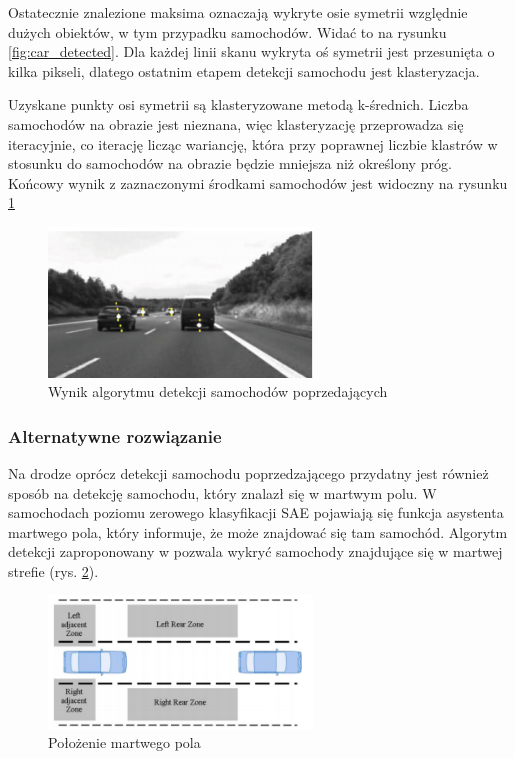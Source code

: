 Ostatecznie znalezione maksima oznaczają wykryte osie symetrii względnie dużych obiektów, w tym przypadku samochodów. 
Widać to na rysunku \ref{fig:car_detected}. 
Dla każdej linii skanu wykryta oś symetrii jest przesunięta o kilka pikseli, dlatego ostatnim etapem detekcji samochodu jest klasteryzacja.

Uzyskane punkty osi symetrii są klasteryzowane metodą k-średnich. 
Liczba samochodów na obrazie jest nieznana, więc klasteryzację przeprowadza się iteracyjnie, co iterację licząc wariancję, która przy poprawnej liczbie klastrów w stosunku do samochodów na obrazie będzie mniejsza niż określony próg. 
Końcowy wynik z zaznaczonymi środkami samochodów jest widoczny na rysunku \ref{fig:car_end}

\begin{figure}
  \centering
  \includegraphics[width=7cm]{img/car_end.png}
  \caption{Wynik algorytmu detekcji samochodów poprzedających\cite{T1}}
  \label{fig:car_end}
\end{figure}

\subsubsection{Alternatywne rozwiązanie}

Na drodze oprócz detekcji samochodu poprzedzającego przydatny jest również sposób na detekcję samochodu, który znalazł się w martwym polu. 
W samochodach poziomu zerowego klasyfikacji SAE pojawiają się funkcja asystenta martwego pola, który informuje, że może znajdować się tam samochód.
Algorytm detekcji zaproponowany w \cite{T11} pozwala wykryć samochody znajdujące się w martwej strefie (rys. \ref{fig:car_detection2_blind_spot2}).

\begin{figure}
  \centering
  \includegraphics[width=7cm]{img/car_detection2_blind_spot.png}
  \caption{Położenie martwego pola\cite{T11}}
  \label{fig:car_detection2_blind_spot2}
\end{figure}

